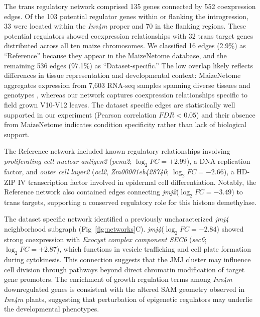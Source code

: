 \documentclass[9pt,twocolumn,twoside]{rilabRxiv}
\newcommand{\invfour}{\textit{Inv4m}\xspace}
\newcommand{\jmjii}{\textit{jmj2}\xspace}
\newcommand{\jmjiv}{\textit{jmj4}\xspace}
\begin{document}
The trans regulatory network comprised 135 genes connected by 552 coexpression edges.
Of the 103 potential regulator genes within or flanking the introgression, 33 were located within the \invfour proper and 70 in the flanking regions.
These potential regulators showed coexpression relationships with 32 trans target genes distributed across all ten maize chromosomes.
We classified 16 edges (2.9\%) as ``Reference'' because they appear in the MaizeNetome database, and the remaining 536 edges (97.1\%) as ``Dataset-specific.''
The low overlap likely reflects differences in tissue representation and developmental context: MaizeNetome aggregates expression from 7,603 RNA-seq samples spanning diverse tissues and genotypes \cite{feng2023}, whereas our network captures coexpression relationships specific to field grown V10-V12 leaves.
The dataset specific edges are statistically well supported in our experiment (Pearson correlation $FDR < 0.05$) and their absence from MaizeNetome indicates condition specificity rather than lack of biological support.

The Reference network included known regulatory relationships involving \textit{proliferating cell nuclear antigen2} (\textit{pcna2}; $\log_2 FC = +2.99$), a DNA replication factor, and \textit{outer cell layer2} (\textit{ocl2}, \textit{Zm00001eb428740}; $\log_2 FC = -2.66$), a HD-ZIP IV transcription factor involved in epidermal cell differentiation.
Notably, the Reference network also contained edges connecting \jmjii ($\log_2 FC = -3.49$) to trans targets, supporting a conserved regulatory role for this histone demethylase.

The dataset specific network identified a previously uncharacterized \jmjiv neighborhood subgraph (Fig~\ref{fig:networks}C).
\jmjiv ($\log_2 FC = -2.84$) showed strong coexpression with \textit{Exocyst complex component SEC6} (\textit{sec6}; $\log_2 FC = +2.87$), which functions in vesicle trafficking and cell plate formation during cytokinesis.
This connection suggests that the JMJ cluster may influence cell division through pathways beyond direct chromatin modification of target gene promoters.
The enrichment of growth regulation terms among \invfour downregulated genes is consistent with the altered SAM geometry observed in \invfour plants, suggesting that perturbation of epigenetic regulators may underlie the developmental phenotypes.
\end{document}
